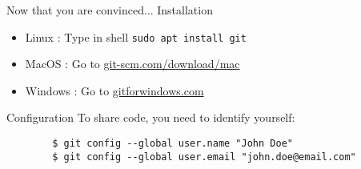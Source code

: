 \documentclass{beamer}
\begin{document}
	\begin{frame}{Now that you are convinced... Installation}
		\begin{itemize}
			\item Linux : Type in shell \texttt{sudo apt install git}
			\item MacOS : Go to \url{git-scm.com/download/mac}
			\item Windows : Go to \url{gitforwindows.com}
		\end{itemize}
	\end{frame}
	\begin{frame}[fragile]{Configuration}
	To share code, you need to identify yourself:
	\begin{verbatim}
		$ git config --global user.name "John Doe"
		$ git config --global user.email "john.doe@email.com"
	\end{verbatim}
	\end{frame}
\end{document}
